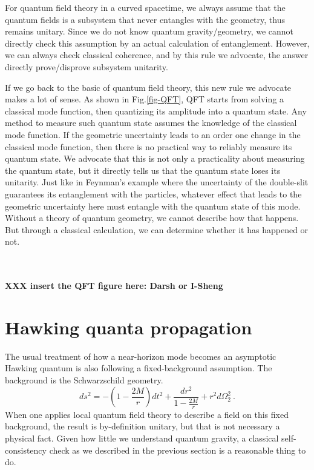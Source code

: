 \documentclass[aps,showpacs,twocolumn,floats,prd,superscriptaddress,nofootinbib]{revtex4-1}
\begin{document}
For quantum field theory in a curved spacetime, we always assume that the quantum fields is a subsystem that never entangles with the geometry, thus remains unitary.
Since we do not know quantum gravity/geometry, we cannot directly check this assumption by an actual calculation of entanglement.
However, we can always check classical coherence, and by this rule we advocate, the answer directly prove/disprove subsystem unitarity.

If we go back to the basic of quantum field theory, this new rule we advocate makes a lot of sense. As shown in Fig.\ref{fig-QFT}, QFT starts from solving a classical mode function, then quantizing its amplitude into a quantum state. 
Any method to measure such quantum state assumes the knowledge of the classical mode function. 
If the geometric uncertainty leads to an order one change in the classical mode function, then there is no practical way to reliably measure its quantum state. 
We advocate that this is not only a practicality about measuring the quantum state, but it directly tells us that the quantum state loses its unitarity. 
Just like in Feynman's example where the uncertainty of the double-slit guarantees its entanglement with the particles, whatever effect that leads to the geometric uncertainty here must entangle with the quantum state of this mode. 
Without a theory of quantum geometry, we cannot describe how that happens. 
But through a classical calculation, we can determine whether it has happened or not.

\ \\ \ \\
{\bf XXX insert the QFT figure here: Darsh or I-Sheng}


\section{Hawking quanta propagation}
\label{sec-BlackHole}

The usual treatment of how a near-horizon mode becomes an asymptotic Hawking quantum is also following a fixed-background assumption.
The background is the Schwarzschild geometry.
\begin{equation}
ds^2 = -\left(1-\frac{2M}{r}\right)dt^2 + \frac{dr^2}{1-\frac{2M}{r}} + r^2d\Omega_2^2~.
\end{equation}
When one applies local quantum field theory to describe a field on this fixed background, the result is by-definition unitary, but that is not necessary a physical fact. 
Given how little we understand quantum gravity, a classical self-consistency check as we described in the previous section is a reasonable thing to do.
\end{document}
